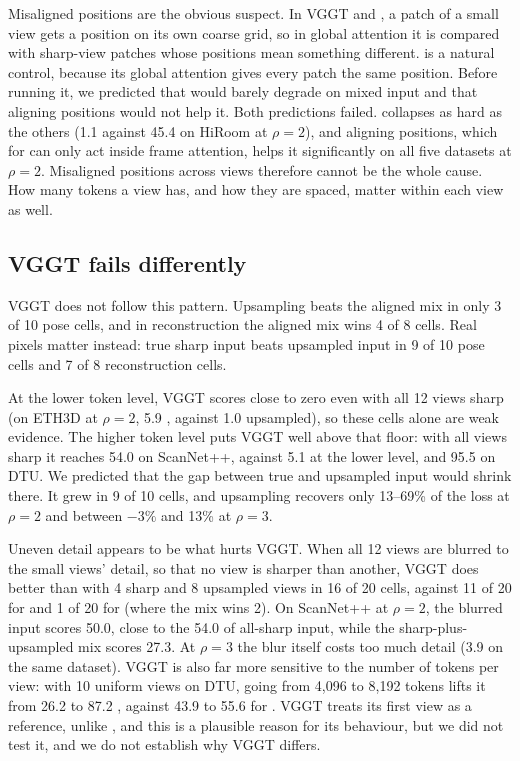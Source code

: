 Misaligned positions are the obvious suspect. In VGGT and \pithree, a patch of a small view gets a position on its own coarse grid, so in global attention it is compared with sharp-view patches whose positions mean something different. \dathree is a natural control, because its global attention gives every patch the same position. Before running it, we predicted that \dathree would barely degrade on mixed input and that aligning positions would not help it. Both predictions failed. \dathree collapses as hard as the others (1.1 \auc against 45.4 on HiRoom at $\rho{=}2$), and aligning positions, which for \dathree can only act inside frame attention, helps it significantly on all five datasets at $\rho{=}2$. Misaligned positions across views therefore cannot be the whole cause. How many tokens a view has, and how they are spaced, matter within each view as well.

\subsection{VGGT fails differently}
\label{sec:vggt}

VGGT does not follow this pattern. Upsampling beats the aligned mix in only 3 of 10 pose cells, and in reconstruction the aligned mix wins 4 of 8 cells. Real pixels matter instead: true sharp input beats upsampled input in 9 of 10 pose cells and 7 of 8 reconstruction cells.

At the lower token level, VGGT scores close to zero even with all 12 views sharp (on ETH3D at $\rho{=}2$, 5.9 \auc, against 1.0 upsampled), so these cells alone are weak evidence. The higher token level puts VGGT well above that floor: with all views sharp it reaches 54.0 on ScanNet++, against 5.1 at the lower level, and 95.5 on DTU. We predicted that the gap between true and upsampled input would shrink there. It grew in 9 of 10 cells, and upsampling recovers only 13--69\% of the loss at $\rho{=}2$ and between $-3\%$ and 13\% at $\rho{=}3$.

Uneven detail appears to be what hurts VGGT. When all 12 views are blurred to the small views' detail, so that no view is sharper than another, VGGT does better than with 4 sharp and 8 upsampled views in 16 of 20 cells, against 11 of 20 for \dathree and 1 of 20 for \pithree (where the mix wins 2). On ScanNet++ at $\rho{=}2$, the blurred input scores 50.0, close to the 54.0 of all-sharp input, while the sharp-plus-upsampled mix scores 27.3. At $\rho{=}3$ the blur itself costs too much detail (3.9 on the same dataset). VGGT is also far more sensitive to the number of tokens per view: with 10 uniform views on DTU, going from 4{,}096 to 8{,}192 tokens lifts it from 26.2 to 87.2 \auc, against 43.9 to 55.6 for \pithree. VGGT treats its first view as a reference, unlike \pithree, and this is a plausible reason for its behaviour, but we did not test it, and we do not establish why VGGT differs.

